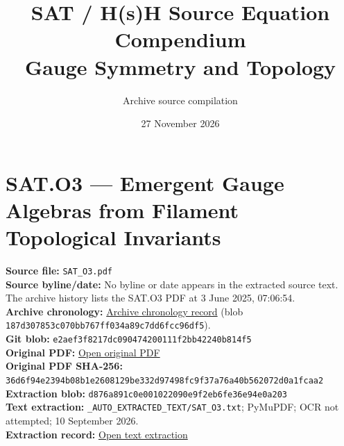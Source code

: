 \documentclass[11pt]{article}
\title{SAT / H(s)H Source Equation Compendium\\[3pt]\large Gauge Symmetry and Topology}
\author{Archive source compilation}
\date{27 November 2026}
\begin{document}
\maketitle
\thispagestyle{empty}

\section*{SAT.O3 --- Emergent Gauge Algebras from Filament Topological Invariants}

\textbf{Source file:} \texttt{SAT\_O3.pdf}\\
\textbf{Source byline/date:} No byline or date appears in the extracted source text. The archive history lists the SAT.O3 PDF at 3 June 2025, 07:06:54.\\
\textbf{Archive chronology:} \href{https://github.com/Satobloc/SAT_THEORY_ARCHIVE_2023-25/blob/main/SAT_HISTORY_ROUNDUP.txt}{Archive chronology record} (blob \texttt{187d307853c070bb767ff034a89c7dd6fcc96df5}).\\
\textbf{Git blob:} \texttt{e2aef3f8217dc090474200111f2bb42240b814f5}\\
\textbf{Original PDF:} \href{https://github.com/Satobloc/SAT_THEORY_ARCHIVE_2023-25/blob/main/SAT_O3.pdf}{Open original PDF}\\
\textbf{Original PDF SHA-256:} \texttt{36d6f94e2394b08b1e2608129be332d97498fc9f37a76a40b562072d0a1fcaa2}\\
\textbf{Extraction blob:} \texttt{d876a891c0e001022090e9f2eb6fe36e94e0a203}\\
\textbf{Text extraction:} \texttt{\_AUTO\_EXTRACTED\_TEXT/SAT\_O3.txt}; PyMuPDF; OCR not attempted; 10 September 2026.\\
\textbf{Extraction record:} \href{https://github.com/Satobloc/SAT_THEORY_ARCHIVE_2023-25/blob/main/_AUTO_EXTRACTED_TEXT/SAT_O3.txt}{Open text extraction}
\end{document}
